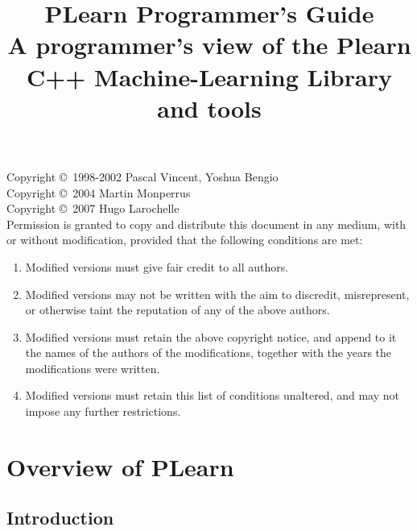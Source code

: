 \documentclass[11pt]{book}
\title{\Huge PLearn Programmer's Guide\\ \Large A programmer's view of the Plearn C++ Machine-Learning Library and tools}
\begin{document}
\thispagestyle{empty}

\maketitle

\pagebreak

\vspace*{10cm}



Copyright \copyright\ 1998-2002 Pascal Vincent, Yoshua Bengio \\
Copyright \copyright\ 2004 Martin Monperrus \\
Copyright \copyright\ 2007 Hugo Larochelle \\

Permission is granted to copy and distribute this document in any medium,
with or without modification, provided that the following conditions are
met:

\begin{enumerate}
\item Modified versions must give fair credit to all authors.
\item Modified versions may not be written with the aim to discredit, misrepresent, or otherwise taint the
      reputation of any of the above authors.
\item Modified versions must retain the above copyright notice, and append to
   it the names of the authors of the modifications, together with the years the
   modifications were written.
\item Modified versions must retain this list of conditions unaltered, 
    and may not impose any further restrictions.
\end{enumerate}


\pagebreak

\tableofcontents

\cleardoublepage\pagebreak
{}


\chapter{ Overview of PLearn}
\section{ Introduction}
\end{document}
